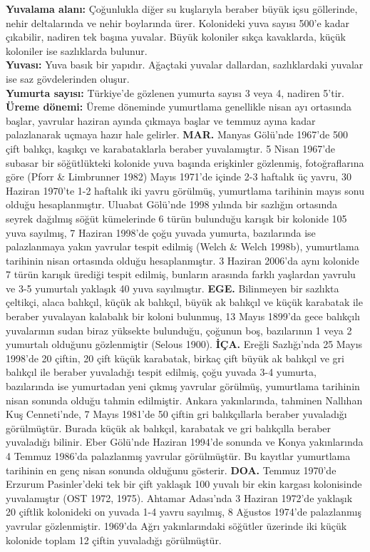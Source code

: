 \documentclass[
  letterpaper,
  DIV=11,
  numbers=noendperiod]{scrreprt}
\begin{document}
\textbf{Yuvalama alanı:} Çoğunlukla diğer su kuşlarıyla beraber büyük
içsu göllerinde, nehir deltalarında ve nehir boylarında ürer. Kolonideki
yuva sayısı 500'e kadar çıkabilir, nadiren tek başına yuvalar. Büyük
koloniler sıkça kavaklarda, küçük koloniler ise sazlıklarda bulunur.\\
\textbf{Yuvası:} Yuva basık bir yapıdır. Ağaçtaki yuvalar dallardan,
sazlıklardaki yuvalar ise saz gövdelerinden oluşur.\\
\textbf{Yumurta sayısı:} Türkiye'de gözlenen yumurta sayısı 3 veya 4,
nadiren 5'tir.\\
\textbf{Üreme dönemi:} Üreme döneminde yumurtlama genellikle nisan ayı
ortasında başlar, yavrular haziran ayında çıkmaya başlar ve temmuz ayına
kadar palazlanarak uçmaya hazır hale gelirler. \textbf{MAR.} Manyas
Gölü'nde 1967'de 500 çift balıkçı, kaşıkçı ve karabataklarla beraber
yuvalamıştır. 5 Nisan 1967'de subasar bir söğütlükteki kolonide yuva
başında erişkinler gözlenmiş, fotoğraflarına göre (Pforr \& Limbrunner
1982) Mayıs 1971'de içinde 2-3 haftalık üç yavru, 30 Haziran 1970'te 1-2
haftalık iki yavru görülmüş, yumurtlama tarihinin mayıs sonu olduğu
hesaplanmıştır. Uluabat Gölü'nde 1998 yılında bir sazlığın ortasında
seyrek dağılmış söğüt kümelerinde 6 türün bulunduğu karışık bir kolonide
105 yuva sayılmış, 7 Haziran 1998'de çoğu yuvada yumurta, bazılarında
ise palazlanmaya yakın yavrular tespit edilmiş (Welch \& Welch 1998b),
yumurtlama tarihinin nisan ortasında olduğu hesaplanmıştır. 3 Haziran
2006'da aynı kolonide 7 türün karışık ürediği tespit edilmiş, bunların
arasında farklı yaşlardan yavrulu ve 3-5 yumurtalı yaklaşık 40 yuva
sayılmıştır. \textbf{EGE.} Bilinmeyen bir sazlıkta çeltikçi, alaca
balıkçıl, küçük ak balıkçıl, büyük ak balıkçıl ve küçük karabatak ile
beraber yuvalayan kalabalık bir koloni bulunmuş, 13 Mayıs 1899'da gece
balıkçılı yuvalarının sudan biraz yüksekte bulunduğu, çoğunun boş,
bazılarının 1 veya 2 yumurtalı olduğunu gözlenmiştir (Selous 1900).
\textbf{İÇA.} Ereğli Sazlığı'nda 25 Mayıs 1998'de 20 çiftin, 20 çift
küçük karabatak, birkaç çift büyük ak balıkçıl ve gri balıkçıl ile
beraber yuvaladığı tespit edilmiş, çoğu yuvada 3-4 yumurta, bazılarında
ise yumurtadan yeni çıkmış yavrular görülmüş, yumurtlama tarihinin nisan
sonunda olduğu tahmin edilmiştir. Ankara yakınlarında, tahminen Nallıhan
Kuş Cenneti'nde, 7 Mayıs 1981'de 50 çiftin gri balıkçıllarla beraber
yuvaladığı görülmüştür. Burada küçük ak balıkçıl, karabatak ve gri
balıkçılla beraber yuvaladığı bilinir. Eber Gölü'nde Haziran 1994'de
sonunda ve Konya yakınlarında 4 Temmuz 1986'da palazlanmış yavrular
görülmüştür. Bu kayıtlar yumurtlama tarihinin en genç nisan sonunda
olduğunu gösterir. \textbf{DOA.} Temmuz 1970'de Erzurum Pasinler'deki
tek bir çift yaklaşık 100 yuvalı bir ekin kargası kolonisinde
yuvalamıştır (OST 1972, 1975). Ahtamar Adası'nda 3 Haziran 1972'de
yaklaşık 20 çiftlik kolonideki on yuvada 1-4 yavru sayılmış, 8 Ağustos
1974'de palazlanmış yavrular gözlenmiştir. 1969'da Ağrı yakınlarındaki
söğütler üzerinde iki küçük kolonide toplam 12 çiftin yuvaladığı
görülmüştür.
\end{document}
